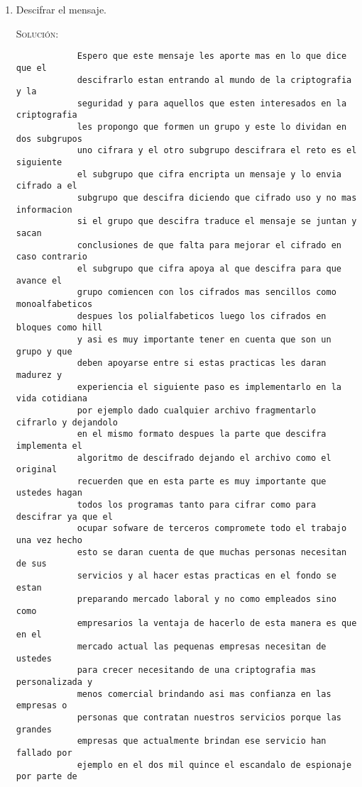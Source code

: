 \documentclass[letterpaper,10pt]{article}
\begin{document}
\begin{enumerate}
\begin{enumerate}
        \item Descifrar el mensaje.
        
        \textsc{Solución:}
        \begin{verbatim}
            Espero que este mensaje les aporte mas en lo que dice que el 
            descifrarlo estan entrando al mundo de la criptografia y la 
            seguridad y para aquellos que esten interesados en la criptografia 
            les propongo que formen un grupo y este lo dividan en dos subgrupos 
            uno cifrara y el otro subgrupo descifrara el reto es el siguiente 
            el subgrupo que cifra encripta un mensaje y lo envia cifrado a el 
            subgrupo que descifra diciendo que cifrado uso y no mas informacion 
            si el grupo que descifra traduce el mensaje se juntan y sacan 
            conclusiones de que falta para mejorar el cifrado en caso contrario 
            el subgrupo que cifra apoya al que descifra para que avance el 
            grupo comiencen con los cifrados mas sencillos como monoalfabeticos 
            despues los polialfabeticos luego los cifrados en bloques como hill 
            y asi es muy importante tener en cuenta que son un grupo y que 
            deben apoyarse entre si estas practicas les daran madurez y 
            experiencia el siguiente paso es implementarlo en la vida cotidiana 
            por ejemplo dado cualquier archivo fragmentarlo cifrarlo y dejandolo 
            en el mismo formato despues la parte que descifra implementa el 
            algoritmo de descifrado dejando el archivo como el original 
            recuerden que en esta parte es muy importante que ustedes hagan 
            todos los programas tanto para cifrar como para descifrar ya que el 
            ocupar sofware de terceros compromete todo el trabajo una vez hecho 
            esto se daran cuenta de que muchas personas necesitan de sus 
            servicios y al hacer estas practicas en el fondo se estan 
            preparando mercado laboral y no como empleados sino como 
            empresarios la ventaja de hacerlo de esta manera es que en el 
            mercado actual las pequenas empresas necesitan de ustedes 
            para crecer necesitando de una criptografia mas personalizada y 
            menos comercial brindando asi mas confianza en las empresas o 
            personas que contratan nuestros servicios porque las grandes 
            empresas que actualmente brindan ese servicio han fallado por
            ejemplo en el dos mil quince el escandalo de espionaje por parte de

\end{verbatim}
\end{enumerate}
\end{enumerate}
\end{document}
